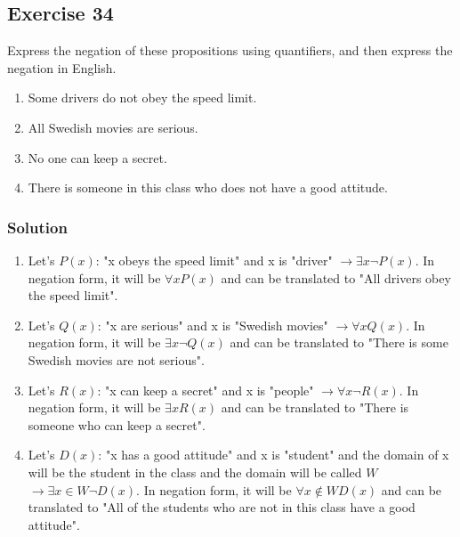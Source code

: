 \documentclass{article}
\begin{document}
\subsection*{Exercise 34}
Express the negation of these propositions using quantifiers, and then express the negation in English.
\begin{enumerate} [label = (\alph*)]
    \item Some drivers do not obey the speed limit.
    \item All Swedish movies are serious.
    \item No one can keep a secret.
    \item There is someone in this class who does not have a good attitude.
\end{enumerate}
\subsubsection*{Solution}
\begin{enumerate} [label = (\alph*)]
    \item Let's $P(x)$: "x obeys the speed limit" and x is "driver" $\rightarrow \exists x\lnot P(x)$. In negation form, it will be $\forall xP(x)$ and can be translated to "All drivers obey the speed limit".
    \item Let's $Q(x)$: "x are serious" and x is "Swedish movies" $\rightarrow \forall xQ(x)$. In negation form, it will be $\exists x\lnot Q(x)$ and can be translated to "There is some Swedish movies are not serious".
    \item Let's $R(x)$: "x can keep a secret" and x is "people" $\rightarrow \forall x\lnot R(x)$. In negation form, it will be $\exists xR(x)$ and can be translated to "There is someone who can keep a secret".
    \item Let's $D(x)$: "x has a good attitude" and x is "student" and the domain of x will be the student in the class and the domain will be called $W$ $\rightarrow \exists x\in W\lnot D(x)$. In negation form, it will be $\forall x\notin WD(x)$ and can be translated to "All of the students who are not in this class have a good attitude".
\end{enumerate}
\end{document}
